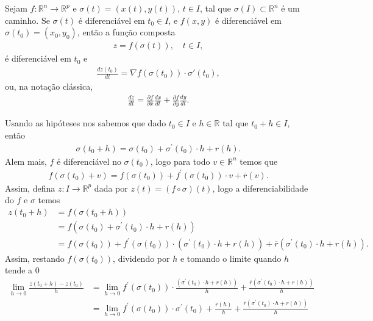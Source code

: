 \begin{homeworkProblem}
  Sejam $f : \mathbb{R}^n \to \mathbb{R}^p$ e $\sigma(t)=(x(t),y(t))$, $t\in I$, tal que $\sigma(I)\subset \mathbb{R}^n$ é um caminho. Se $\sigma(t)$ é diferenciável em $t_0 \in I$, e $f(x,y)$ é diferenciável em $\sigma(t_0)=(x_0,y_0)$, então a função composta
  \begin{align*}    
    z = f(\sigma(t)), \quad t\in I,
  \end{align*}
  é diferenciável em $t_0$ e
  \begin{align*}
    \frac{dz(t_0)}{dt} = \nabla f(\sigma(t_0)) \cdot \sigma'(t_0),   
  \end{align*}
  ou, na notação clássica,
  \begin{align*}
    \frac{dz}{dt} = \frac{\partial f}{\partial x}\frac{dx}{dt} + \frac{\partial f}{\partial y}\frac{dy}{dt}.   
  \end{align*}
  \begin{solution}
    Usando as hipóteses nos sabemos que dado $t_0\in I$ e $h\in\mathbb{R}$ tal que $t_0+h\in I$, então 
    \begin{align*}
      \sigma(t_0+h)=\sigma(t_0)+\sigma^{\prime}(t_0)\cdot h+r(h). 
    \end{align*}
    Alem mais, $f$ é diferenciável no $\sigma(t_0)$, logo para todo $v\in\mathbb{R}^{n}$ temos que
    \begin{align*}
      f(\sigma(t_0)+v)=f(\sigma(t_0))+f^{\prime}(\sigma(t_0))\cdot v+\overline{r}(v).
    \end{align*}
    Assim, defina $z:I\to\mathbb{R}^{p}$ dada por $z(t)=(f\circ \sigma)(t)$, logo a diferenciabilidade do $f$ e $\sigma$ temos 
    \begin{align*}
      z(t_0+h)&=f(\sigma(t_0+h))\\
      &=f(\sigma(t_0)+\sigma^{\prime}(t_0)\cdot h+r(h))\\
      &=f(\sigma(t_0))+f^{\prime}(\sigma(t_0))\cdot(\sigma^{\prime}(t_0)\cdot h+r(h))+\overline{r}(\sigma^{\prime}(t_0)\cdot h+r(h)).
    \end{align*}
    Assim, restando $f(\sigma(t_0))$, dividendo por $h$ e tomando o limite quando $h$ tende a $0$
    \begin{align*}
      \lim_{h \to 0}\frac{z(t_0+h)-z(t_0)}{h}&=\lim_{h \to 0}f^{\prime}(\sigma(t_0))\cdot\frac{(\sigma^{\prime}(t_0)\cdot h+r(h))}{h}+\frac{\overline{r}(\sigma^{\prime}(t_0)\cdot h+r(h))}{h}\\
      &=\lim_{h \to 0}f^{\prime}(\sigma(t_0))\cdot\sigma^{\prime}(t_0)+\frac{r(h)}{h}+\frac{\overline{r}(\sigma^{\prime}(t_0)\cdot h+r(h))}{h}\\

\end{align*}
\end{solution}
\end{homeworkProblem}
